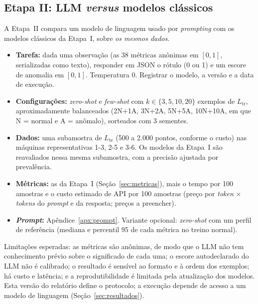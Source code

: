 \subsection{Etapa II: LLM \emph{versus} modelos clássicos}\label{sec:etapa2}
A Etapa~II compara um modelo de linguagem usado por \emph{prompting} com os modelos clássicos da Etapa~I,
sobre \emph{os mesmos dados}.
\begin{itemize}
  \item \textbf{Tarefa:} dada uma observação (as 38 métricas anônimas em $[0,1]$, serializadas como texto),
        responder em JSON o rótulo (0 ou 1) e um escore de anomalia em $[0,1]$. Temperatura 0. Registrar o
        modelo, a versão e a data de execução.
  \item \textbf{Configurações:} \emph{zero-shot} e \emph{few-shot} com $k\in\{3,5,10,20\}$ exemplos de
        $L_{\mathrm{tr}}$, aproximadamente balanceados (2N+1A, 3N+2A, 5N+5A, 10N+10A, em que N = normal e
        A = anômalo), sorteados com 3 sementes.
  \item \textbf{Dados:} uma subamostra de $L_{\mathrm{te}}$ (500 a 2.000 pontos, conforme o custo) nas máquinas
        representativas 1-3, 2-5 e 3-6. Os modelos da Etapa~I são reavaliados nessa mesma subamostra, com a
        precisão ajustada por prevalência.
  \item \textbf{Métricas:} as da Etapa~I (Seção~\ref{sec:metricas}), mais o tempo por 100 amostras e o custo
        estimado de API por 100 amostras (preço por \emph{token} $\times$ \emph{tokens} do \emph{prompt} e da
        resposta; preços a preencher).
  \item \textbf{\emph{Prompt}:} Apêndice~\ref{apx:prompt}. Variante opcional: \emph{zero-shot} com um perfil de
        referência (mediana e percentil 95 de cada métrica no treino normal).
\end{itemize}
\noindent Limitações esperadas: as métricas são anônimas, de modo que o LLM não tem conhecimento prévio sobre o
significado de cada uma; o escore autodeclarado do LLM não é calibrado; o resultado é sensível ao formato e à
ordem dos exemplos; há custo e latência; e a reprodutibilidade é limitada pela atualização dos modelos. Esta
versão do relatório define o protocolo; a execução depende de acesso a um modelo de linguagem
(Seção~\ref{sec:resultados}).

